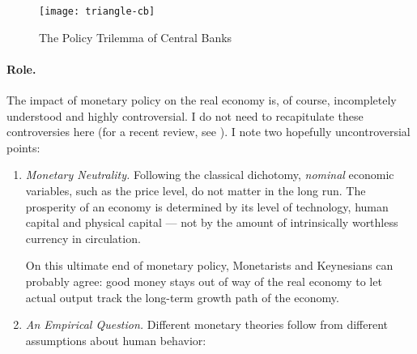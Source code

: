  \begin{figure}[htbp]
	\centering
	\texttt{[image: triangle-cb]}  
	\caption{The Policy Trilemma of Central Banks}
	\label{fig:triangle-cb}
\end{figure}

\paragraph[Role]{Role.} %
The impact of monetary policy on the real economy is, of course, incompletely understood and highly controversial. I do not need to recapitulate these controversies here (for a recent review, see \citealt{Wapshott2011}). I note two hopefully uncontroversial points:

\begin{enumerate}
	\item \emph{Monetary Neutrality.} \label{itm:monetary-neutrality} Following the classical dichotomy, \emph{nominal} economic variables, such as the price level, do not matter in the long run. The prosperity of an economy is determined by its level of technology, human capital and physical capital --- not by the amount of intrinsically worthless currency in circulation. 
	
	On this ultimate end of monetary policy, Monetarists and Keynesians can probably agree: good money stays out of way of the real economy to let actual output track the long-term growth path of the economy.

	\item \label{itm:empirical-macroeconomics} \emph{An Empirical Question.} 
	Different monetary theories follow from different assumptions about human behavior:
	


\end{enumerate}
